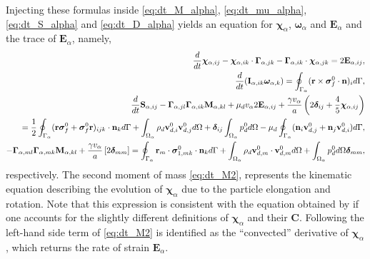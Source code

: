 Injecting these formulas inside \ref{eq:dt_M_alpha}, \ref{eq:dt_mu_alpha}, \ref{eq:dt_S_alpha} and \ref{eq:dt_D_alpha}  yields an equation for $\bm\chi_\alpha$, $\bm\omega_\alpha$ and $\textbf{E}_\alpha$ and the trace of $\textbf{E}_\alpha$, namely,
\begin{align}
    \ddt \bm\chi_{\alpha,ij}
    -\bm\chi_{\alpha,ik} \cdot \bm\Gamma_{\alpha,jk}
    - \bm\Gamma_{\alpha,ik} \cdot \bm\chi_{\alpha,jk}
    =
    2\textbf{E}_{\alpha,ij},
    \label{eq:dt_M2}
    \\
    \ddt (\textbf{I}_{\alpha,ik}\bm\omega_{\alpha,k} )
    = 
    \intS{(\textbf{r}\times\bm\sigma_f^0\cdot \textbf{n})_i},
    \label{eq:dt_mu2}
    \\
    \ddt \textbf{S}_{\alpha,ij}
    -  \bm\Gamma_{\alpha,jl}\bm\Gamma_{\alpha,ik} \textbf{M}_{\alpha,kl}  
    + \mu_d v_\alpha 2\textbf{E}_{\alpha,ij}
    + \frac{\gamma v_\alpha }{a} \left(
    2\bm\delta_{ij} 
    + \frac{4 }{5} \bm\chi_{\alpha,ij}
    \right)\nonumber\\
    = 
    \frac{1}{2}\intS{(\textbf{r}\bm\sigma_f^0 + \bm\sigma_f^0\textbf{r})_{ijk}\cdot \textbf{n}_k} 
    + \intO{\rho_d \textbf{v}_{d,i}^0\textbf{v}_{d,j}^0}
    + \bm\delta_{ij}\intO{p_d^0} 
    - \mu_d \intS{(\textbf{n}_i \textbf{v}_{d,j}^0 + \textbf{n}_j \textbf{v}_{d,i}^0)},
    \label{eq:dt_S2}
    \\
    \label{eq:dt_trM2}
    -  \bm\Gamma_{\alpha,ml}\bm\Gamma_{\alpha,mk} \textbf{M}_{\alpha,kl}  
    + \frac{\gamma v_\alpha }{a} 
    \left[
    2\bm\delta_{mm} 
    \right]
    = 
    \intS{\textbf{r}_m\cdot\bm\sigma_{1,mk}^0\cdot \textbf{n}_k} 
    + \intO{\rho_d \textbf{v}_{d,m}^0\cdot \textbf{v}_{d,m}^0}
    + \intO{p_d^0} \bm\delta_{mm},
\end{align}
respectively. 
The second moment of mass \ref{eq:dt_M2}, represents the kinematic equation describing the evolution of $\bm\chi_\alpha$ due to the particle elongation and rotation. 
Note that this expression is consistent with the equation obtained by \citet{goddard1967nonlinear} if one accounts for the slightly different definitions of $\bm\chi_\alpha$ and their \textbf{C}.
Following \citet{goddard1967nonlinear} the left-hand side term of \ref{eq:dt_M2} is identified as the ``convected'' derivative of $\bm\chi_\alpha$, which returns the rate of strain $\textbf{E}_\alpha$. 
